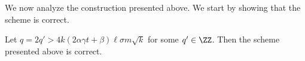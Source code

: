 
We now analyze the construction presented above. We start by showing that the scheme is correct.




\begin{lemma}[Correctness]
Let $q=2q'>4k\left(2\alpha\gamma t  + \beta \right)\ell\sigma m\sqrt{k}$ for some $q'\in\ZZ$. Then the scheme presented above is correct.
\end{lemma}
